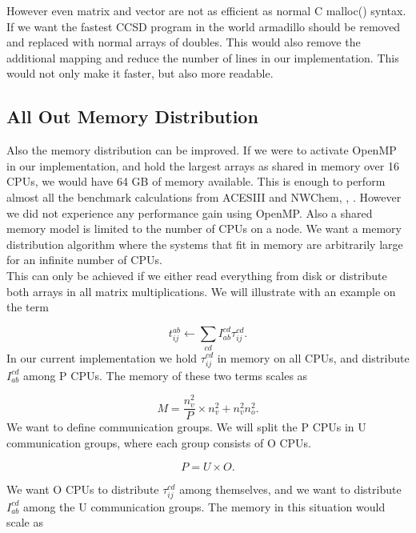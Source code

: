 \documentclass[a4paper,norsk,11pt,twoside]{report}
\begin{document}
However even matrix and vector are not as efficient as normal C malloc() syntax. If we want the fastest CCSD program in the world armadillo should be removed and replaced with normal arrays of doubles. This would also remove the additional mapping and reduce the number of lines in our implementation. This would not only make it faster, but also more readable. 

\subsection{All Out Memory Distribution \label{comgroups}}
Also the memory distribution can be improved. If we were to activate OpenMP in our implementation, and hold the largest arrays as shared in memory over 16 CPUs, we would have 64 GB of memory available. This is enough to perform almost all the benchmark calculations from ACESIII and NWChem, \cite{aces_non_ref}, \cite{nwchem_non_ref}. However we did not experience any performance gain using OpenMP. Also a shared memory model is limited to the number of CPUs on a node. We want a memory distribution algorithm where the systems that fit in memory are arbitrarily large for an infinite number of CPUs. \\

This can only be achieved if we either read everything from disk or distribute both arrays in all matrix multiplications. We will illustrate with an example on the term

\begin{equation}
t_{ij}^{ab} \leftarrow \sum_{cd} I_{ab}^{cd} \tau_{ij}^{cd} .
\end{equation}
In our current implementation we hold $\tau_{ij}^{cd}$ in memory on all CPUs, and distribute $I_{ab}^{cd}$ among P CPUs. The memory of these two terms scales as

\begin{equation}
M = \frac{n_v^2}{P} \times n_v^2 + n_v^2 n_o^2 \label{memory11} .
\end{equation}
We want to define communication groups. We will split the P CPUs in U communication groups, where each group consists of O CPUs. 

\begin{equation}
P = U \times O .
\end{equation}

We want O CPUs to distribute $\tau_{ij}^{cd}$ among themselves, and we want to distribute $I_{ab}^{cd}$ among the U communication groups. The memory in this situation would scale as 
\end{document}
